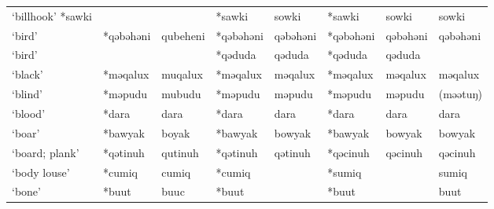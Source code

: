\begin{landscape}
\begin{longtable}[c]{@{}p{3cm}<{\raggedright}p{2.75cm}<{\raggedright}p{2.75cm}<{\raggedright}p{2.75cm}<{\raggedright}p{2.75cm}<{\raggedright}p{2.75cm}<{\raggedright}p{2.75cm}<{\raggedright}p{2.75cm}<{\raggedright}@{}}
`billhook'                         *sawki            &                    &                                & *sawki             & sowki                      & *sawki           & sowki                    & sowki                             \\
`bird'                                               & *qəbəhəni          & qubeheni                       & *qəbəhəni          & qəbəhəni                   & *qəbəhəni        & qəbəhəni                 & qəbəhəni                          \\
`bird'                                               &                    &                                & *qəduda            & qəduda                     & *qəduda          & qəduda                   &                                   \\
`black'                                              & *məqalux           & muqalux                        & *məqalux           & məqalux                    & *məqalux         & məqalux                  & məqalux                           \\
`blind'                                              & *məpudu            & mubudu                         & *məpudu            & məpudu                     & *məpudu          & məpudu                   & (məətuŋ)                          \\
`blood'                                              & *dara              & dara                           & *dara              & dara                       & *dara            & dara                     & dara                              \\
`boar'                                               & *bawyak            & boyak                          & *bawyak            & bowyak                     & *bawyak          & bowyak                   & bowyak                            \\
`board; plank'                                       & *qətinuh           & qutinuh                        & *qətinuh           & qətinuh                    & *qəcinuh         & qəcinuh                  & qəcinuh                           \\
`body louse'                                         & *cumiq             & cumiq                          & *cumiq             &                            & *sumiq           &                          & sumiq                             \\
`bone'                                               & *buut              & buuc                           & *buut              &                            & *buut            &                          & buut                              \\

\end{longtable}
\end{landscape}
